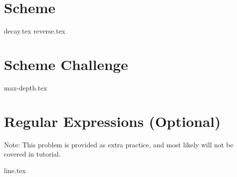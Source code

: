 \documentclass{exam}
\begin{document}
\newpage
\section{Scheme}
\begin{questions}
{decay.tex}
\newpage
{reverse.tex}
\end{questions}

\section{Scheme Challenge}
\begin{questions}
{max-depth.tex}
\end{questions}

\newpage
\section{Regular Expressions (Optional)}
Note: This problem is provided as extra practice, and most likely will not be covered in tutorial.
\begin{questions}
{line.tex}
\end{questions}

\end{document}
